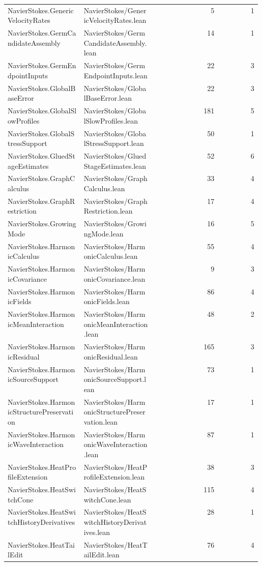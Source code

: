 \begin{longtable}{p{0.30\linewidth}p{0.28\linewidth}rr}
NavierStokes.GenericVelocityRates & NavierStokes/GenericVelocityRates.lean & 5 & 1\\
NavierStokes.GermCandidateAssembly & NavierStokes/GermCandidateAssembly.lean & 14 & 1\\
NavierStokes.GermEndpointInputs & NavierStokes/GermEndpointInputs.lean & 22 & 3\\
NavierStokes.GlobalBaseError & NavierStokes/GlobalBaseError.lean & 22 & 3\\
NavierStokes.GlobalSlowProfiles & NavierStokes/GlobalSlowProfiles.lean & 181 & 5\\
NavierStokes.GlobalStressSupport & NavierStokes/GlobalStressSupport.lean & 50 & 1\\
NavierStokes.GluedStageEstimates & NavierStokes/GluedStageEstimates.lean & 52 & 6\\
NavierStokes.GraphCalculus & NavierStokes/GraphCalculus.lean & 33 & 4\\
NavierStokes.GraphRestriction & NavierStokes/GraphRestriction.lean & 17 & 4\\
NavierStokes.GrowingMode & NavierStokes/GrowingMode.lean & 16 & 5\\
NavierStokes.HarmonicCalculus & NavierStokes/HarmonicCalculus.lean & 55 & 4\\
NavierStokes.HarmonicCovariance & NavierStokes/HarmonicCovariance.lean & 9 & 3\\
NavierStokes.HarmonicFields & NavierStokes/HarmonicFields.lean & 86 & 4\\
NavierStokes.HarmonicMeanInteraction & NavierStokes/HarmonicMeanInteraction.lean & 48 & 2\\
NavierStokes.HarmonicResidual & NavierStokes/HarmonicResidual.lean & 165 & 3\\
NavierStokes.HarmonicSourceSupport & NavierStokes/HarmonicSourceSupport.lean & 73 & 1\\
NavierStokes.HarmonicStructurePreservation & NavierStokes/HarmonicStructurePreservation.lean & 17 & 1\\
NavierStokes.HarmonicWaveInteraction & NavierStokes/HarmonicWaveInteraction.lean & 87 & 1\\
NavierStokes.HeatProfileExtension & NavierStokes/HeatProfileExtension.lean & 38 & 3\\
NavierStokes.HeatSwitchCone & NavierStokes/HeatSwitchCone.lean & 115 & 4\\
NavierStokes.HeatSwitchHistoryDerivatives & NavierStokes/HeatSwitchHistoryDerivatives.lean & 28 & 1\\
NavierStokes.HeatTailEdit & NavierStokes/HeatTailEdit.lean & 76 & 4\\

\end{longtable}
